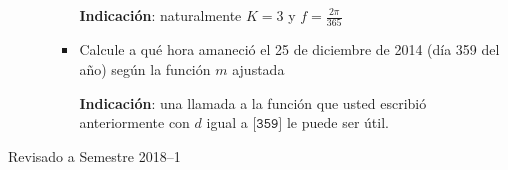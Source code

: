 \documentclass[letterpaper,11pt]{article}
\begin{document}
\begin{enumerate}
\begin{enumerate}
\begin{itemize}
\textbf{Indicaci\'on}: naturalmente $K = 3$ y $f = \frac{2\pi}{365}$

\item Calcule a qu\'e hora amaneci\'o el 25 de diciembre de 2014 (d\'ia 359 del a\~no) seg\'un la funci\'on $m$ ajustada 

\textbf{Indicaci\'on}:  una llamada a la funci\'on que usted escribi\'o anteriormente con $d$ igual a $\texttt{[359]}$ le puede ser \'util.
\end{itemize}
\end{enumerate}


\end{enumerate}

\vfill
\hfill Revisado a Semestre 2018--1
\end{document}
